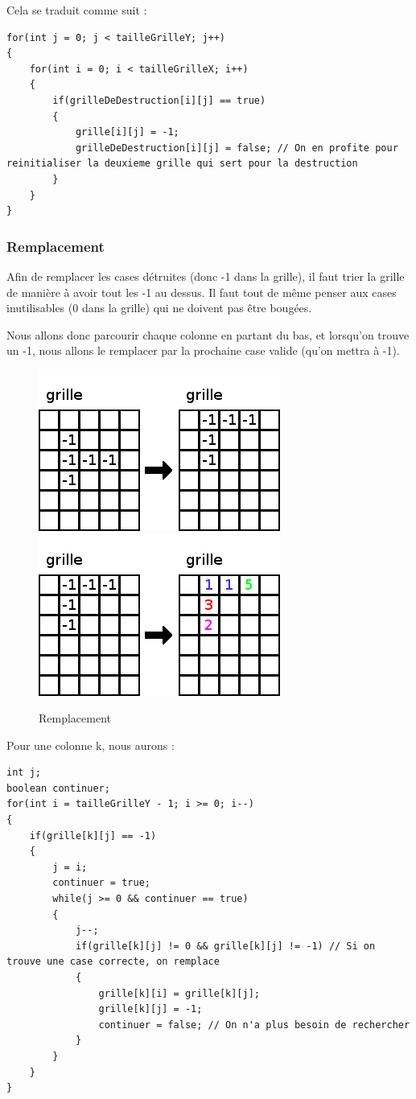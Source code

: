 Cela se traduit comme suit :

\begin{lstlisting}
for(int j = 0; j < tailleGrilleY; j++)
{
	for(int i = 0; i < tailleGrilleX; i++)
	{
		if(grilleDeDestruction[i][j] == true)
		{
			grille[i][j] = -1;
			grilleDeDestruction[i][j] = false; // On en profite pour reinitialiser la deuxieme grille qui sert pour la destruction
		}
	}
}
\end{lstlisting}

\subsubsection{Remplacement}

	Afin de remplacer les cases détruites (donc -1 dans la grille), il faut trier la grille de manière à avoir tout les -1 au dessus.
	Il faut tout de même penser aux cases inutilisables (0 dans la grille) qui ne doivent pas être bougées.
	
	Nous allons donc parcourir chaque colonne en partant du bas, et lorsqu'on trouve un -1, nous allons le remplacer par la prochaine case valide (qu'on mettra à -1).
	
\begin{figure}[position]
	\center
	\caption{\label{Remplacement} Remplacement}
	\includegraphics{imgs/Remplacement1}
	\includegraphics{imgs/Remplacement2}
\end{figure}
	
	Pour une colonne k, nous aurons :
\begin{lstlisting}
int j;
boolean continuer;
for(int i = tailleGrilleY - 1; i >= 0; i--)
{
	if(grille[k][j] == -1)
	{
		j = i;
		continuer = true;
		while(j >= 0 && continuer == true)
		{
			j--;
			if(grille[k][j] != 0 && grille[k][j] != -1) // Si on trouve une case correcte, on remplace
			{
				grille[k][i] = grille[k][j];
				grille[k][j] = -1;
				continuer = false; // On n'a plus besoin de rechercher
			}
		}
	}
}
\end{lstlisting}

